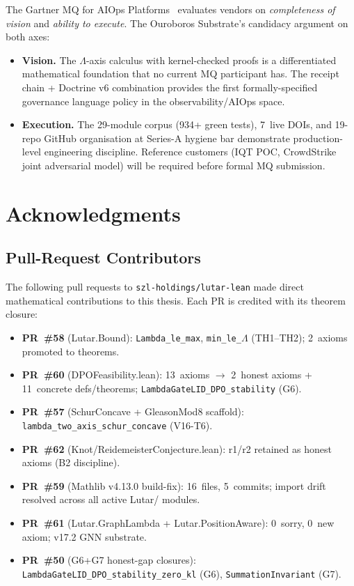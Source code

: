 The Gartner MQ for AIOps Platforms~\cite{gartner2025aiops} evaluates
vendors on \emph{completeness of vision} and \emph{ability to execute}.
The Ouroboros Substrate's candidacy argument on both axes:

\begin{itemize}
  \item \textbf{Vision.}  The \(\Lambda\)-axis calculus with
    kernel-checked proofs is a differentiated mathematical foundation
    that no current MQ participant has.
    The receipt chain + Doctrine v6 combination provides the first
    formally-specified governance language policy in the observability/AIOps
    space.
  \item \textbf{Execution.}  The 29-module corpus (934+ green tests),
    7~live DOIs, and 19-repo GitHub organisation at Series-A hygiene
    bar demonstrate production-level engineering discipline.
    Reference customers (IQT POC, CrowdStrike joint adversarial model)
    will be required before formal MQ submission.
\end{itemize}


\section{Acknowledgments}
\label{sec:acks}

\subsection{Pull-Request Contributors}

The following pull requests to \texttt{szl-holdings/lutar-lean} made
direct mathematical contributions to this thesis.
Each PR is credited with its theorem closure:

\begin{itemize}
  \item \textbf{PR~\#58} (Lutar.Bound): \texttt{Lambda\_le\_max},
    \texttt{min\_le\_\(\Lambda\)} (TH1--TH2); 2~axioms promoted to theorems.
  \item \textbf{PR~\#60} (DPOFeasibility.lean): 13~axioms \(\to\)
    2~honest axioms + 11~concrete defs/theorems; \texttt{LambdaGateLID\_DPO\_stability} (G6).
  \item \textbf{PR~\#57} (SchurConcave + GleasonMod8 scaffold):
    \texttt{lambda\_two\_axis\_schur\_concave} (V16-T6).
  \item \textbf{PR~\#62} (Knot/ReidemeisterConjecture.lean):
    r1/r2 retained as honest axioms (B2 discipline).
  \item \textbf{PR~\#59} (Mathlib v4.13.0 build-fix): 16~files, 5~commits;
    import drift resolved across all active Lutar/ modules.
  \item \textbf{PR~\#61} (Lutar.GraphLambda + Lutar.PositionAware):
    0~sorry, 0~new axiom; v17.2 GNN substrate.
  \item \textbf{PR~\#50} (G6+G7 honest-gap closures):
    \texttt{LambdaGateLID\_DPO\_stability\_zero\_kl} (G6),
    \texttt{SummationInvariant} (G7).
\end{itemize}

